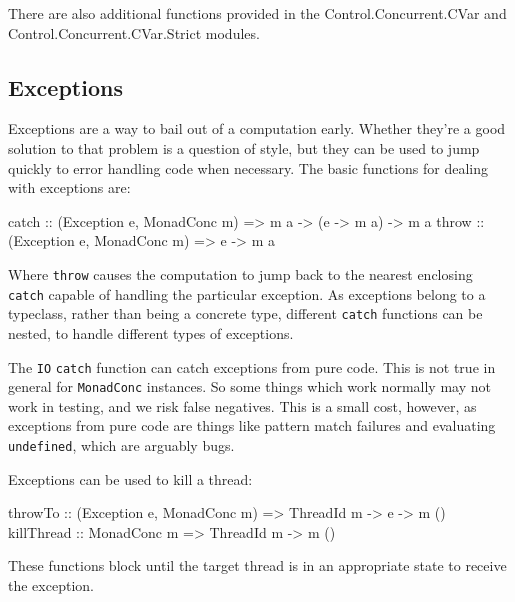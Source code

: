 There are also additional functions provided in the
Control\-.Concurrent\-.CVar and Control\-.Concurrent\-.CVar\-.Strict
modules.

\subsection{Exceptions}
\label{sec:abstraction-typeclass-excs}

Exceptions are a way to bail out of a computation early. Whether
they're a good solution to that problem is a question of style, but
they can be used to jump quickly to error handling code when
necessary. The basic functions for dealing with exceptions are:

\begin{haskellcode}
catch :: (Exception e, MonadConc m) => m a -> (e -> m a) -> m a
throw :: (Exception e, MonadConc m) => e -> m a
\end{haskellcode}

Where \verb|throw| causes the computation to jump back to the nearest
enclosing \verb|catch| capable of handling the particular
exception. As exceptions belong to a typeclass, rather than being a
concrete type, different \verb|catch| functions can be nested, to
handle different types of exceptions.

\begin{departure}
  The \verb|IO| \verb|catch| function can catch exceptions from pure
  code. This is not true in general for \verb|MonadConc| instances.
  So some things which work normally may not work in testing, and we
  risk false negatives. This is a small cost, however, as exceptions
  from pure code are things like pattern match failures and evaluating
  \verb|undefined|, which are arguably bugs.
\end{departure}

Exceptions can be used to kill a thread:

\begin{haskellcode}
throwTo :: (Exception e, MonadConc m) => ThreadId m -> e -> m ()
killThread :: MonadConc m => ThreadId m -> m ()
\end{haskellcode}

These functions block until the target thread is in an appropriate
state to receive the exception.

